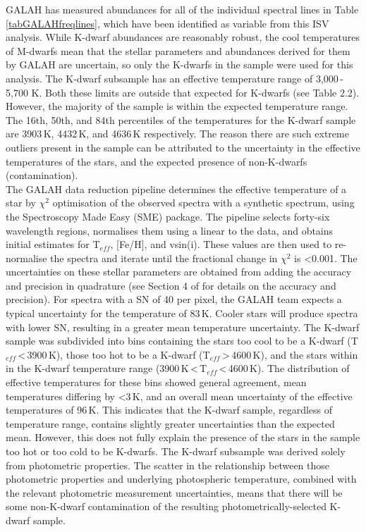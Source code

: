 GALAH has measured abundances for all of the individual spectral lines in Table\,\ref{tabGALAHfreqlines}, which have been identified as variable from this ISV analysis. While K-dwarf abundances are reasonably robust, the cool temperatures of M-dwarfs mean that the stellar parameters and abundances derived for them by GALAH are uncertain, so only the K-dwarfs in the sample were used for this analysis. The K-dwarf subsample has an effective temperature range of 3,000\,-\,5,700 K. Both these limits are outside that expected for K-dwarfs (see Table 2.2). However, the majority of the sample is within the expected temperature range. The 16th, 50th, and 84th percentiles of the temperatures for the K-dwarf sample are 3903\,K, 4432\,K, and 4636\,K respectively. The reason there are such extreme outliers present in the sample can be attributed to the uncertainty in the effective temperatures of the stars, and the expected presence of non-K-dwarfs (contamination).\\ 

The GALAH data reduction pipeline determines the effective temperature of a star by $\chi^2$ optimisation of the observed spectra with a synthetic spectrum, using the Spectroscopy Made Easy (SME) package\citep{1996Valenti}. The pipeline selects forty-six wavelength regions, normalises them using a linear to the data, and obtains initial estimates for T$_{eff}$, [Fe/H], and vsin(i). These values are then used to re-normalise the spectra and iterate until the fractional change in $\chi^2$ is \textless0.001. The uncertainties on these stellar parameters are obtained from adding the accuracy and precision in quadrature (see Section 4 of \citealt{2021Buder} for details on the accuracy and precision). For spectra with a SN of 40 per pixel, the GALAH team expects a typical uncertainty for the temperature of 83\,K. Cooler stars will produce spectra with lower SN, resulting in a greater mean temperature uncertainty. The K-dwarf sample was subdivided into bins containing the stars too cool to be a K-dwarf (T$_{eff}$\,\textless\,3900\,K), those too hot to be a K-dwarf (T$_{eff}$\,\textgreater\,4600\,K), and the stars within in the K-dwarf temperature range (3900\,K\,\textless\,T$_{eff}$\,\textless\,4600\,K). The distribution of effective temperatures for these bins showed general agreement, mean temperatures differing by \textless3\,K, and an overall mean uncertainty of the effective temperatures of 96\,K. This indicates that the K-dwarf sample, regardless of temperature range, contains slightly greater uncertainties than the expected mean. However, this does not fully explain the presence of the stars in the sample too hot or too cold to be K-dwarfs. The K-dwarf subsample was derived solely from photometric properties. The scatter in the relationship between those photometric properties and underlying photospheric temperature, combined with the relevant photometric measurement uncertainties, means that there will be some non-K-dwarf contamination of the resulting photometrically-selected K-dwarf sample.\\ 

